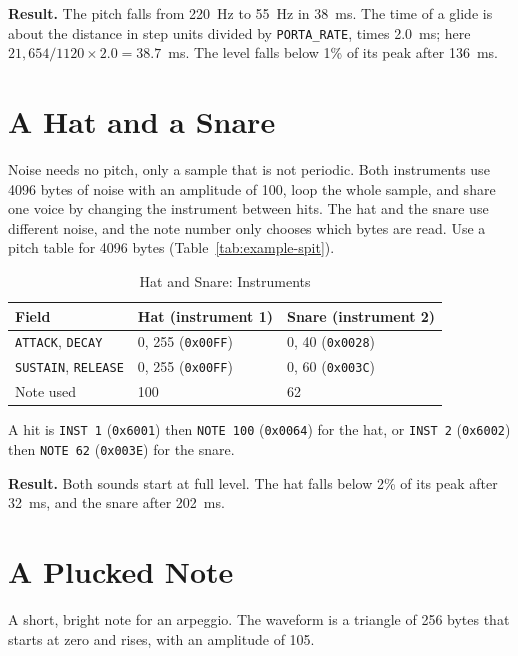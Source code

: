\textbf{Result.} The pitch falls from 220~Hz to 55~Hz in 38~ms. The time of a glide is about the distance in step
units divided by \texttt{PORTA\_RATE}, times 2.0~ms; here $21{,}654 / 1120 \times 2.0 = 38.7$~ms. The level falls below 1\%
of its peak after 136~ms.

\section{A Hat and a Snare}

Noise needs no pitch, only a sample that is not periodic. Both instruments use 4096 bytes of noise with an amplitude of
100, loop the whole sample, and share one voice by changing the instrument between hits. The hat and the snare use
different noise, and the note number only chooses which bytes are read. Use a pitch table for 4096 bytes
(Table~\ref{tab:example-spit}).

\begin{table}[H]
	\centering
	\begin{tabular}{lll}
		\toprule
		\textbf{Field}                     & \textbf{Hat (instrument 1)} & \textbf{Snare (instrument 2)} \\
		\midrule
		\texttt{ATTACK}, \texttt{DECAY}    & 0, 255 (\texttt{0x00FF})    & 0, 40 (\texttt{0x0028})       \\
		\texttt{SUSTAIN}, \texttt{RELEASE} & 0, 255 (\texttt{0x00FF})    & 0, 60 (\texttt{0x003C})       \\
		Note used                          & 100                         & 62                            \\
		\bottomrule
	\end{tabular}
	\caption{Hat and Snare: Instruments}
	\label{tab:ex-hat}
\end{table}

A hit is \texttt{INST 1} (\texttt{0x6001}) then \texttt{NOTE 100} (\texttt{0x0064}) for the hat, or \texttt{INST 2}
(\texttt{0x6002}) then \texttt{NOTE 62} (\texttt{0x003E}) for the snare.

\textbf{Result.} Both sounds start at full level. The hat falls below 2\% of its peak after 32~ms, and the snare after
202~ms.

\section{A Plucked Note}

A short, bright note for an arpeggio. The waveform is a triangle of 256 bytes that starts at zero and rises, with an
amplitude of 105.

